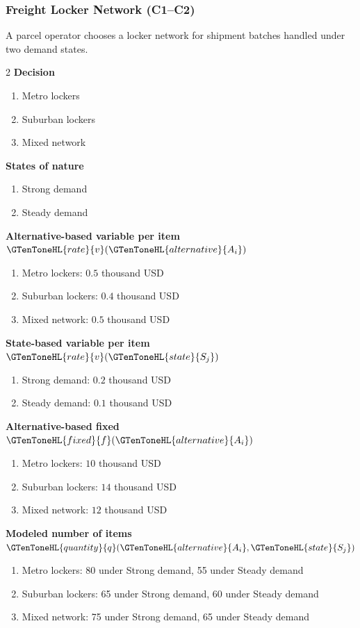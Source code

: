 	\subsubsection{Freight Locker Network (C1--C2)}
	\label{sec:problem27-freight-locker-network-c1-c2}
	A parcel operator chooses a locker network for shipment batches handled under two demand states.
	\begin{multicols}{2}
	\textbf{Decision }
	\begin{enumerate}[label=\arabic*.]
\item Metro lockers
\item Suburban lockers
\item Mixed network
	\end{enumerate}
	\textbf{States of nature}
	\begin{enumerate}[label=\arabic*.]
\item Strong demand
\item Steady demand
	\end{enumerate}
	\columnbreak
	\textbf{Alternative-based variable  per item $\GTenToneHL{rate}{v}(\GTenToneHL{alternative}{A_i})$}
\begin{enumerate}[label=\arabic*.]
\item Metro lockers: $0.5$ thousand USD
\item Suburban lockers: $0.4$ thousand USD
\item Mixed network: $0.5$ thousand USD\end{enumerate}
\textbf{State-based variable  per item $\GTenToneHL{rate}{v}(\GTenToneHL{state}{S_j})$}
\begin{enumerate}[label=\arabic*.]
\item Strong demand: $0.2$ thousand USD
\item Steady demand: $0.1$ thousand USD\end{enumerate}
\textbf{Alternative-based fixed  $\GTenToneHL{fixed}{f}(\GTenToneHL{alternative}{A_i})$}
\begin{enumerate}[label=\arabic*.]
\item Metro lockers: $10$ thousand USD
\item Suburban lockers: $14$ thousand USD
\item Mixed network: $12$ thousand USD\end{enumerate}
\textbf{Modeled number of items $\GTenToneHL{quantity}{q}(\GTenToneHL{alternative}{A_i},\GTenToneHL{state}{S_j})$}
\begin{enumerate}[label=\arabic*.]
\item Metro lockers: 80 under Strong demand, 55 under Steady demand
\item Suburban lockers: 65 under Strong demand, 60 under Steady demand
\item Mixed network: 75 under Strong demand, 65 under Steady demand
\end{enumerate}
	\end{multicols}

